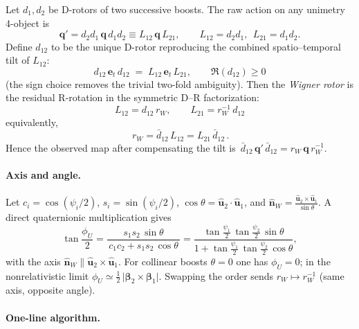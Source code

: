 \documentclass[11pt]{article}
\numberwithin{equation}{section}
\begin{document}
Let $d_1,d_2$ be D-rotors of two successive boosts. The raw action on any unimetry 4-object is
\begin{equation}
\mathbf q' = d_2 d_1\, \mathbf q\, d_1 d_2 \equiv L_{12}\,\mathbf q\,L_{21},\qquad
L_{12}=d_2 d_1,\ \ L_{21}=d_1 d_2.
\end{equation}
Define $d_{12}$ to be the unique D-rotor reproducing the combined spatio--temporal tilt of $L_{12}$:
\begin{equation}
\boxed{\, d_{12}\,\mathbf e_t\, d_{12} \;=\; L_{12}\,\mathbf e_t\, L_{21},\qquad \Re(d_{12})\ge0 \,}
\label{eq:d12-uniqueness}
\end{equation}
(the sign choice removes the trivial two-fold ambiguity). Then the \emph{Wigner rotor} is the residual
R-rotation in the symmetric D--R factorization:
\begin{equation}
\boxed{\, L_{12}=d_{12}\,r_W,\qquad L_{21}=r_W^{-1}\,d_{12} \,}
\label{eq:DR-polar}
\end{equation}
equivalently,
\begin{equation}
\boxed{\, r_W=\bar d_{12}\,L_{12}=L_{21}\,\bar d_{12} \,}.
\label{eq:wigner-rotor-def}
\end{equation}
Hence the observed map after compensating the tilt is $\,\bar d_{12}\,\mathbf q'\,\bar d_{12}=r_W\,\mathbf q\,r_W^{-1}$.

\paragraph{Axis and angle.}
Let $c_i=\cos(\psi_i/2)$, $s_i=\sin(\psi_i/2)$, $\cos\theta=\hat{\mathbf u}_2\!\cdot\!\hat{\mathbf u}_1$, and
$\hat{\mathbf n}_W=\frac{\hat{\mathbf u}_2\times\hat{\mathbf u}_1}{\sin\theta}$. A direct quaternionic multiplication
gives
\begin{equation}
\tan\frac{\phi_U}{2}=
\frac{s_1 s_2\,\sin\theta}{\,c_1 c_2+s_1 s_2\,\cos\theta\,}
=\frac{\tan\frac{\psi_1}{2}\,\tan\frac{\psi_2}{2}\,\sin\theta}{1+\tan\frac{\psi_1}{2}\,\tan\frac{\psi_2}{2}\,\cos\theta},
\end{equation}
with the axis $\hat{\mathbf n}_W\parallel \hat{\mathbf u}_2\times\hat{\mathbf u}_1$. For collinear boosts $\theta=0$ one has $\phi_U=0$;
in the nonrelativistic limit $\phi_U\simeq \tfrac12\,\lvert \boldsymbol\beta_2\times\boldsymbol\beta_1\rvert$. Swapping the order sends
$r_W\mapsto r_W^{-1}$ (same axis, opposite angle).

\paragraph{One-line algorithm.}
\begin{center}
\end{center}
\end{document}
